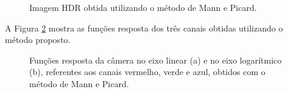 \begin{figure}[H]
  \centering
  \quad %
  \quad %
  \caption{Imagem HDR obtida utilizando o método de Mann e Picard.}
  \label{figMann2}
\end{figure}

A Figura \ref{figMannFR} mostra as funções resposta dos três canais obtidas utilizando o método proposto.

\begin{figure}[H]
  \centering
  \quad %
  \caption{Funções resposta da câmera no eixo linear (a) e no eixo logarítmico (b), referentes aos canais vermelho, verde e azul, obtidos com o método de Mann e Picard.}
  \label{figMannFR}
\end{figure}